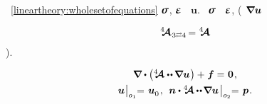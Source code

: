 

\label{para:equationsindisplacements.linearelasticity}
 
~\eqref{lineartheory:wholesetofequations}
$\linearstress$, $\infinitesimaldeformation$ ~$\bm{u}$.
~$\linearstress$
~$\infinitesimaldeformation$,
(~${\hspace{-0.2ex} \bm{\nabla}\hspace{-0.2ex} \bm{u}}$

\noindent
\begin{equation}\label{thesymmetryofthestiffnesstensor}
\stiffnesstensor_{
   \hspace{.12ex}
   3 \scalebox{.6}[.8]{$\rightleftarrows$} 4
}
\hspace{-0.25ex} =
\stiffnesstensor
\end{equation}
).

\nopagebreak\vspace{-0.1em}
\begin{equation}\label{lineartheory:equationsindisplacements}
\begin{array}{c}
\boldnabla \dotp \left( \stiffnesstensor \dotdotp \hspace{-0.12ex} \boldnabla \bm{u} \hspace{.1ex} \right) + \hspace{.1ex} \bm{f} = \hspace{.1ex} \bm{0}
\hspace{.16ex} , \\[.4em]
%
\bm{u} \hspace{.1ex} \bigr|_{o_1} \hspace{-0.64ex} = \hspace{.2ex} \bm{u}_{\raisemath{-0.1em}{0}}
\hspace{.16ex} , \:\:
\unitnormalvector \dotp %
\stiffnesstensor \hspace{-0.08ex} \dotdotp \hspace{-0.24ex} \boldnabla \bm{u}
\hspace{.25ex} \bigr|_{o_2} \hspace{-0.64ex} = \hspace{.2ex} \bm{p}
\hspace{.16ex} .
\end{array}
\end{equation}%

